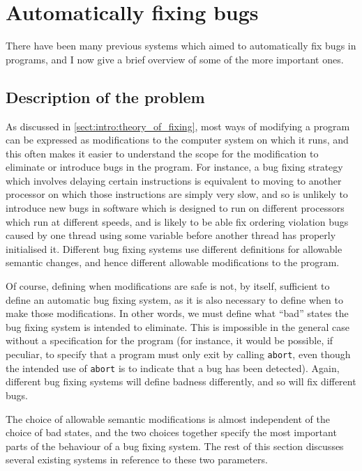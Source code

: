 \section{Automatically fixing bugs}

There have been many previous systems which aimed to automatically fix
bugs in programs, and I now give a brief overview of some of the more
important ones.

\subsection{Description of the problem}
\label{sect:rw:theory_of_fixing}

As discussed in \autoref{sect:intro:theory_of_fixing}, most ways of
modifying a program can be expressed as modifications to the computer
system on which it runs, and this often makes it easier to understand
the scope for the modification to eliminate or introduce bugs in the
program.  For instance, a bug fixing strategy which involves delaying
certain instructions is equivalent to moving to another processor on
which those instructions are simply very slow, and so is unlikely to
introduce new bugs in software which is designed to run on different
processors which run at different speeds, and is likely to be able fix
ordering violation bugs caused by one thread using some variable
before another thread has properly initialised it.  Different bug
fixing systems use different definitions for allowable semantic
changes, and hence different allowable modifications to the program.

Of course, defining when modifications are safe is not, by itself,
sufficient to define an automatic bug fixing system, as it is also
necessary to define when to make those modifications.  In other words,
we must define what ``bad'' states the bug fixing system is intended
to eliminate.  This is impossible in the general case without a
specification for the program (for instance, it would be possible, if
peculiar, to specify that a program must only exit by calling
\texttt{abort}, even though the intended use of \texttt{abort} is to
indicate that a bug has been detected).  Again, different bug fixing
systems will define badness differently, and so will fix different
bugs.

The choice of allowable semantic modifications is almost independent
of the choice of bad states, and the two choices together specify the
most important parts of the behaviour of a bug fixing system.  The
rest of this section discusses several existing systems in reference
to these two parameters.

